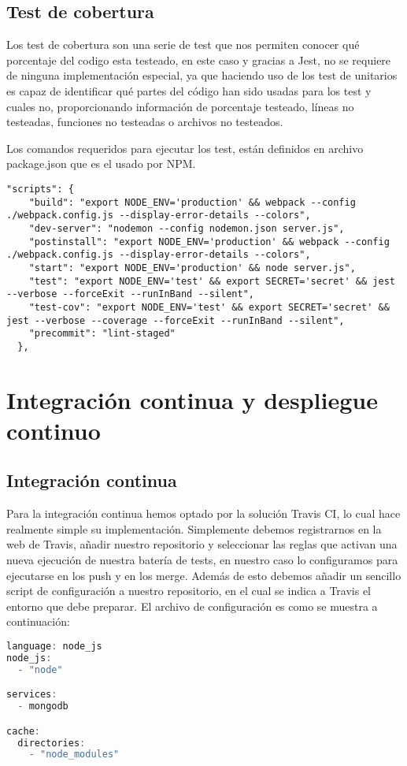 \subsection { Test de cobertura }
Los test de cobertura son una serie de test que nos permiten conocer qué porcentaje del codigo esta testeado, en este caso y gracias a Jest, no se requiere de ninguna implementación especial, ya que haciendo uso de los test de unitarios es capaz de identificar qué partes del código han sido usadas para los test y cuales no, proporcionando información de porcentaje testeado, líneas no testeadas, funciones no testeadas o archivos no testeados.

Los comandos requeridos para ejecutar los test, están definidos en archivo package.json que es el usado por NPM.
\begin{lstlisting}
"scripts": {
    "build": "export NODE_ENV='production' && webpack --config ./webpack.config.js --display-error-details --colors",
    "dev-server": "nodemon --config nodemon.json server.js",
    "postinstall": "export NODE_ENV='production' && webpack --config ./webpack.config.js --display-error-details --colors",
    "start": "export NODE_ENV='production' && node server.js",
    "test": "export NODE_ENV='test' && export SECRET='secret' && jest --verbose --forceExit --runInBand --silent",
    "test-cov": "export NODE_ENV='test' && export SECRET='secret' && jest --verbose --coverage --forceExit --runInBand --silent",
    "precommit": "lint-staged"
  },
\end{lstlisting}

\section {Integración continua y despliegue continuo}
\subsection{Integración continua}
Para la integración continua hemos optado por la solución Travis CI, lo cual hace realmente simple su implementación. Simplemente debemos registrarnos en la web de Travis, añadir nuestro repositorio y seleccionar las reglas que activan una nueva ejecución de nuestra batería de tests, en nuestro caso lo configuramos para ejecutarse en los push y en los merge. Además de esto debemos añadir un sencillo script de configuración a nuestro repositorio, en el cual se indica a Travis el entorno que debe preparar. El archivo de configuración es como se muestra a continuación:
\begin{lstlisting}[language=javascript,caption={Test Unitarios},label={lst:appjs}]
language: node_js
node_js:
  - "node"

services:
  - mongodb

cache:
  directories:
    - "node_modules"

\end{lstlisting}
